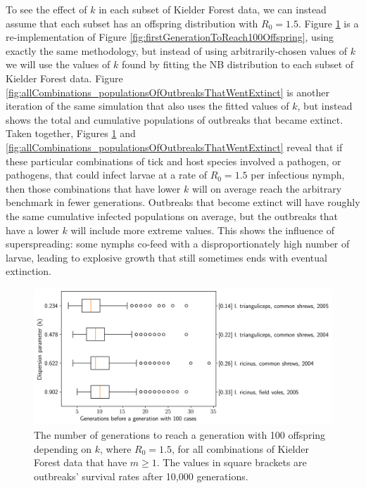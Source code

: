 \documentclass[hidelinks]{article}
\begin{document}
To see the effect of $ k $ in each subset of Kielder Forest data, we can instead assume that each subset has an offspring distribution with $ R_0 = 1.5 $. Figure \ref{fig:allCombinations_firstGenerationReach100Offspring} is a re-implementation of Figure \ref{fig:firstGenerationToReach100Offspring}, using exactly the same methodology, but instead of using arbitrarily-chosen values of $ k $ we will use the values of $ k $ found by fitting the NB distribution to each subset of Kielder Forest data. Figure \ref{fig:allCombinations_populationsOfOutbreaksThatWentExtinct} is another iteration of the same simulation that also uses the fitted values of $ k $, but instead shows the total and cumulative populations of outbreaks that became extinct. Taken together, Figures \ref{fig:allCombinations_firstGenerationReach100Offspring} and \ref{fig:allCombinations_populationsOfOutbreaksThatWentExtinct} reveal that if these particular combinations of tick and host species involved a pathogen, or pathogens, that could infect larvae at a rate of $ R_0 = 1.5 $ per infectious nymph, then those combinations that have lower $ k $ will on average reach the arbitrary benchmark in fewer generations. Outbreaks that become extinct will have roughly the same cumulative infected populations on average, but the outbreaks that have a lower $ k $ will include more extreme values. This shows the influence of superspreading: some nymphs co-feed with a disproportionately high number of larvae, leading to explosive growth that still sometimes ends with eventual extinction.

\begin{figure}[]
	\begin{mdframed}[backgroundcolor=grey250,rightline=false,leftline=false,topline=false]
		\centering
		\includegraphics[width=.73\linewidth,valign=m]{allCombinations_firstGenerationReach100Offspring}
		\caption{The number of generations to reach a generation with 100 offspring depending on $ k $, where $ R_0 = 1.5 $, for all combinations of Kielder Forest data that have $ m \ge 1 $. The values in square brackets are outbreaks' survival rates after 10,000 generations.}
		\label{fig:allCombinations_firstGenerationReach100Offspring}
	\end{mdframed}
\end{figure}
\end{document}

